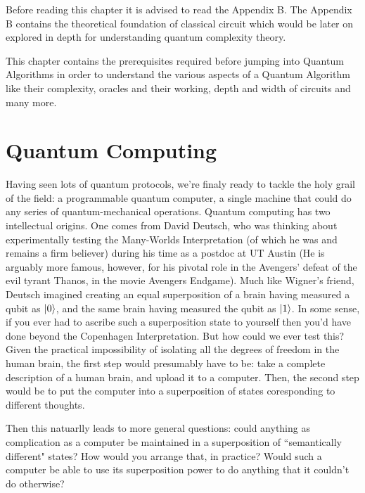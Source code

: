 Before reading this chapter it is advised to read the Appendix B. The Appendix B contains the theoretical foundation of classical circuit which would be later on explored in depth for understanding quantum complexity theory.

This chapter contains the prerequisites required before jumping into Quantum Algorithms in order to understand the various aspects of a Quantum Algorithm like their complexity, oracles and their working, depth and width of circuits and many more.

\section{Quantum Computing}
Having seen lots of quantum protocols, we're finaly ready to tackle the holy grail of the field: a programmable quantum computer, a single machine that could do any series of quantum-mechanical operations. Quantum computing has two intellectual origins. One comes from David Deutsch, who was thinking about experimentally testing the Many-Worlds Interpretation (of which he was and remains a firm believer) during his time as a postdoc at UT Austin (He is arguably more famous, however, for his pivotal role in the Avengers' defeat of the evil tyrant Thanos, in the movie Avengers Endgame). Much like Wigner's friend, Deutsch imagined creating an equal superposition of a brain having measured a qubit as $\ket{0}$, and the same brain having measured the qubit as $\ket{1}$. In some sense, if you ever had to ascribe such a superposition state to yourself then you'd have done beyond the Copenhagen Interpretation. But how could we ever test this? Given the practical impossibility of isolating all the degrees of freedom in the human brain, the first step would presumably have to be: take a complete description of a human brain, and upload it to a computer. Then, the second step would be to put the computer into a superposition of states coresponding to different thoughts.


Then this natuarlly leads to more general questions: could anything as complication as a computer be maintained in a superposition of ``semantically different" states? How would you arrange that, in practice? Would such a computer be able to use its superposition power to do anything that it couldn't do otherwise?

